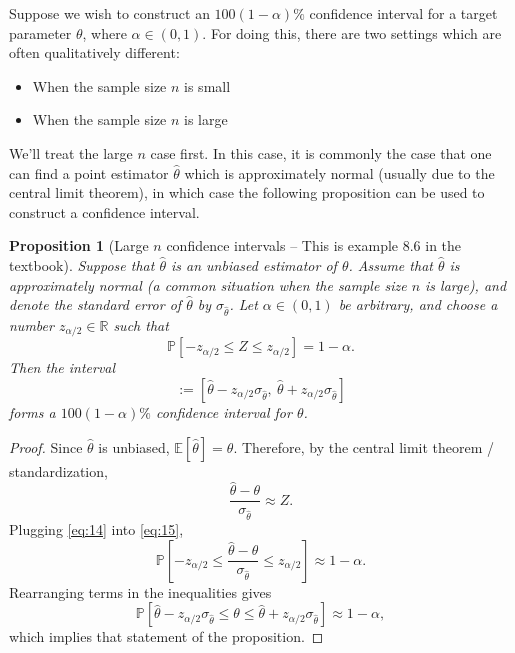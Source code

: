 \documentclass[10pt]{article}
\newtheorem{proposition}[theorem]{Proposition}
\theoremstyle{definition}
\newcommand{\1}[1]{\textbf{1}_{\left[#1\right]}} %
\def\R{\mathbb{R}} %
\def\E{\mathbb{E}} %
\def\P{\mathbb{P}} %
\begin{document}
Suppose we wish to construct an $100(1-\alpha)\%$ confidence interval for a
target parameter $\theta$, where $\alpha\in (0,1)$. For doing this, there are
two settings which are often qualitatively different:
\begin{itemize}
  \item When the sample size $n$ is small
  \item When the sample size $n$ is large
\end{itemize}
We'll treat the large $n$ case first. In this case, it is commonly the case
that one can find a point estimator $\widehat{\theta}$ which is approximately
normal (usually due to the central limit theorem), in which case the following
proposition can be used to construct a confidence interval.

\begin{proposition}[Large $n$ confidence intervals -- This is example 8.6 in
  the textbook]
  \label{prop:large-n-confidence-intervals}
  Suppose that $\widehat{\theta}$ is an unbiased estimator of $\theta$. Assume
  that $\widehat{\theta}$ is approximately normal (a common situation when the
  sample size $n$ is large), and denote the standard error of
  $\widehat{\theta}$ by $\sigma_{\widehat{\theta}}$. Let $\alpha\in (0,1)$ be
  arbitrary, and choose a number $z_{\alpha/2}\in \R$ such that
  \begin{equation}\label{eq:15}
    \P\left[-z_{\alpha/2} \leq
      Z \leq z_{\alpha/2}\right]=1-\alpha.
  \end{equation}
  Then the interval
  \begin{equation*}
    [\widehat{\theta}_{L} ,  \widehat{\theta}_{U} ]
    := [\widehat{\theta} - z_{\alpha/2}\sigma_{\widehat{\theta}},\ \widehat{\theta} + z_{\alpha/2}\sigma_{\widehat{\theta}}]
  \end{equation*}
  forms a $100(1-\alpha)\%$ confidence interval for $\theta$.
\end{proposition}
\begin{proof}
  Since $\widehat{\theta}$ is unbiased, $\E[\widehat{\theta}]=\theta$.
  Therefore, by the central limit theorem / standardization,
  \begin{equation}\label{eq:14}
    \frac{\widehat{\theta}-\theta}{\sigma_{\widehat{\theta}}}\approx Z.
  \end{equation}
  Plugging \cref{eq:14} into \cref{eq:15},
  \begin{equation*}
    \P\left[ -z_{\alpha/2}\leq  \frac{\widehat{\theta}-\theta}{\sigma_{\widehat{\theta}}}\leq z_{\alpha/2}\right] \approx 1-\alpha.
  \end{equation*}
  Rearranging terms in the inequalities gives
  \begin{equation*}
    \P\left[\widehat{\theta} - z_{\alpha/2}\sigma_{\widehat{\theta}}\leq \theta \leq \widehat{\theta} + z_{\alpha/2}\sigma_{\widehat{\theta}}\right] \approx 1-\alpha,
  \end{equation*}
  which implies that statement of the proposition.
\end{proof}
\end{document}
